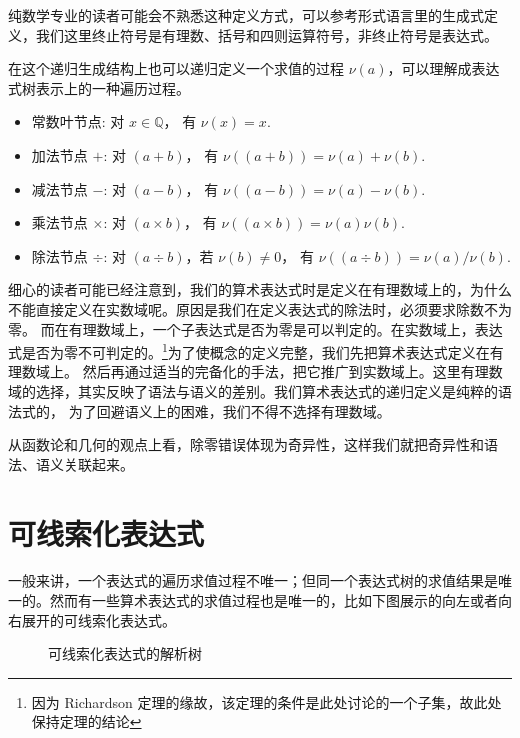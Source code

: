 \documentclass[a4paper,12pt]{book}
\numberwithin{problem}{section}
\numberwithin{definition}{section}
\numberwithin{lemma}{section}
\numberwithin{proposition}{section}
\numberwithin{theorem}{section}
\numberwithin{grammar}{section}
\numberwithin{program}{section}
\numberwithin{convention}{section}
\numberwithin{corollary}{section}
\begin{document}
纯数学专业的读者可能会不熟悉这种定义方式，可以参考形式语言里的生成式定义，我们这里终止符号是有理数、括号和四则运算符号，非终止符号是表达式。

在这个递归生成结构上也可以递归定义一个求值的过程 $\nu(a)$，可以理解成表达式树表示上的一种遍历过程。

\begin{itemize}
\item 常数叶节点: 对 $x \in \mathbb{Q}$， 有 $\nu(x) = x$.
\item 加法节点 $+$: 对 $(a + b)$， 有 $\nu((a + b)) = \nu(a) + \nu(b)$.
\item 减法节点 $-$: 对 $(a - b)$， 有 $\nu((a - b)) = \nu(a) - \nu(b)$.
\item 乘法节点 $\times$: 对 $(a \times b)$， 有 $\nu((a \times b)) = \nu(a) \nu(b)$.
\item 除法节点 $\div$: 对 $(a \div b)$，若 $\nu(b) \neq 0$， 有 $\nu((a \div b)) = \nu(a) / \nu(b)$.
\end{itemize}

细心的读者可能已经注意到，我们的算术表达式时是定义在有理数域上的，为什么不能直接定义在实数域呢。原因是我们在定义表达式的除法时，必须要求除数不为零。
而在有理数域上，一个子表达式是否为零是可以判定的。在实数域上，表达式是否为零不可判定的。\footnote{因为 Richardson 定理的缘故，该定理的条件是此处讨论的一个子集，故此处保持定理的结论}为了使概念的定义完整，我们先把算术表达式定义在有理数域上。
然后再通过适当的完备化的手法，把它推广到实数域上。这里有理数域的选择，其实反映了语法与语义的差别。我们算术表达式的递归定义是纯粹的语法式的，
为了回避语义上的困难，我们不得不选择有理数域。

从函数论和几何的观点上看，除零错误体现为奇异性，这样我们就把奇异性和语法、语义关联起来。

\section{可线索化表达式}

一般来讲，一个表达式的遍历求值过程不唯一；但同一个表达式树的求值结果是唯一的。然而有一些算术表达式的求值过程也是唯一的，比如下图展示的向左或者向右展开的可线索化表达式。

\begin{figure}[ht]
\centering
{}
\caption{可线索化表达式的解析树}\label{fig:syntaxtree-left-right}
\end{figure}
\end{document}
